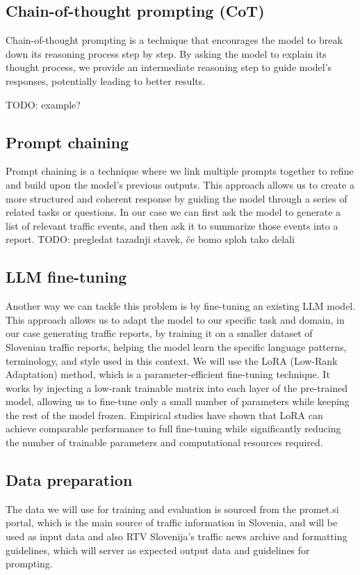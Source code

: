\documentclass[fleqn,moreauthors,10pt]{ds_report}
\begin{document}
\subsection*{Chain-of-thought prompting (CoT)}
Chain-of-thought prompting is a technique that encourages the model to break down its reasoning process step by step.
By asking the model to explain its thought process, we provide an intermediate reasoning step to guide model's responses, potentially leading to better results.

TODO: example?


\subsection{Prompt chaining}
Prompt chaining is a technique where we link multiple prompts together to refine and build upon the model's previous outputs.
This approach allows us to create a more structured and coherent response by guiding the model through a series of related tasks or questions.
In our case we can first ask the model to generate a list of relevant traffic events, and then ask it to summarize those events into a report.
TODO: pregledat tazadnji stavek, če bomo sploh tako delali


\subsection{LLM fine-tuning}
Another way we can tackle this problem is by fine-tuning an existing LLM model.
This approach allows us to adapt the model to our specific task and domain, in our case generating traffic reports, by training it on a smaller dataset of Slovenian traffic reports, helping the model learn the specific language patterns, terminology, and style used in this context.
We will use the LoRA (Low-Rank Adaptation) method, which is a parameter-efficient fine-tuning technique.
It works by injecting a low-rank trainable matrix into each layer of the pre-trained model, allowing us to fine-tune only a small number of parameters while keeping the rest of the model frozen.
Empirical studies have shown that LoRA can achieve comparable performance to full fine-tuning while significantly reducing the number of trainable parameters and computational resources required.

\subsection{Data preparation}
The data we will use for training and evaluation is sourced from the promet.si portal, which is the main source of traffic information in Slovenia, and will be used as input data and also RTV Slovenija's traffic news archive and formatting guidelines, which will server as expected output data and guidelines for prompting.
\end{document}
